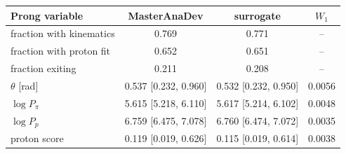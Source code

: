 \begin{tabular}{lccc}
\toprule
Prong variable & MasterAnaDev & surrogate & $W_1$ \\
\midrule
fraction with kinematics & 0.769 & 0.771 & -- \\
fraction with proton fit & 0.652 & 0.651 & -- \\
fraction exiting & 0.211 & 0.208 & -- \\
$\theta$ [rad] & 0.537 [0.232, 0.960] & 0.532 [0.232, 0.950] & 0.0056 \\
$\log P_\pi$ & 5.615 [5.218, 6.110] & 5.617 [5.214, 6.102] & 0.0048 \\
$\log P_p$ & 6.759 [6.475, 7.078] & 6.760 [6.474, 7.072] & 0.0035 \\
proton score & 0.119 [0.019, 0.626] & 0.115 [0.019, 0.614] & 0.0038 \\
\bottomrule
\end{tabular}
